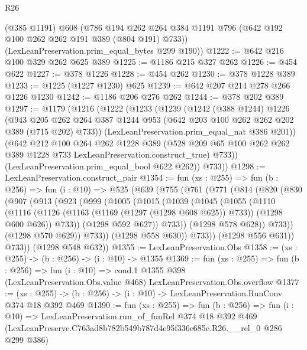 \begin{lexlean}{R26}
\begin{coremodule}
      (@385 @1191)
      @608
      (@786 @194 @262 @264 @384 @1191 @796 (@642 @192 @100 @262 @262 @191 @389 (@804 @191) @733))
      (LexLeanPreservation.prim_equal_bytes @299 @190))
@1222 := @642 @216 @100 @329 @262 @625 @389
@1225 := @1186 @215 @327 @262
@1226 := @454 @622
@1227 := @378 @1226
@1228 := @454 @262
@1230 := @378 @1228 @389
@1233 := @1225 (@1227 @1230) @625
@1239 := @642 @207 @214 @278 @266 @1226 @1230
@1242 := @1186 @206 @276 @262
@1244 := @378 @202 @389
@1297 := @1179
    (@1216
      (@1222
        (@1233
          (@1239
            (@1242
              (@388 @1244)
              @1226
              (@943
                @205
                @262
                @264
                @387
                @1244
                @953
                (@642 @203 @100 @262 @262 @202 @389 (@715 @202) @733))
              (LexLeanPreservation.prim_equal_nat @386 @201))
            (@642
              @212
              @100
              @264
              @262
              @1228
              @389
              (@528 @209 @65 @100 @262 @262 @389 @1228 @733 LexLeanPreservation.construct_true)
              @733))
          (LexLeanPreservation.prim_equal_bool @622 @262))
        @733))
@1298 := LexLeanPreservation.construct_pair
@1354 := fun (xs : @255) =>
  fun (b : @256) =>
  fun (i : @10) =>
  @525
    (@639
      (@755
        (@761
          (@771
            (@814
              (@820
                (@830
                  (@907
                    (@913
                      (@923
                        (@999
                          (@1005
                            (@1015
                              (@1039
                                (@1045
                                  (@1055
                                    (@1110
                                      (@1116
                                        (@1126
                                          (@1163 (@1169 (@1297 (@1298 @608 @625)) @733))
                                          (@1298 @600 @626))
                                        @733))
                                    (@1298 @592 @627))
                                  @733))
                              (@1298 @578 @628))
                            @733))
                        (@1298 @570 @629))
                      @733))
                  (@1298 @558 @630))
                @733))
            (@1298 @556 @631))
          @733))
      (@1298 @548 @632))
@1355 := LexLeanPreservation.Obs
@1358 := (xs : @255) -> (b : @256) -> (i : @10) -> @1355
@1369 := fun (xs : @255) =>
  fun (b : @256) =>
  fun (i : @10) =>
  cond.{1} @1355 @398 (LexLeanPreservation.Obs.value @468) LexLeanPreservation.Obs.overflow
@1377 := (xs : @255) -> (b : @256) -> (i : @10) -> LexLeanPreservation.RunConv @374 @18 @392 @469
@1390 := fun (xs : @255) =>
  fun (b : @256) =>
  fun (i : @10) =>
  LexLeanPreservation.run_of_funRel
    @374
    @18
    @392
    @469
    (LexLeanPreserve.C763ad8b782b549b787d4e95f336e685e.R26.__rel_0 @286 @299 @386)
\end{coremodule}
\end{lexlean}
